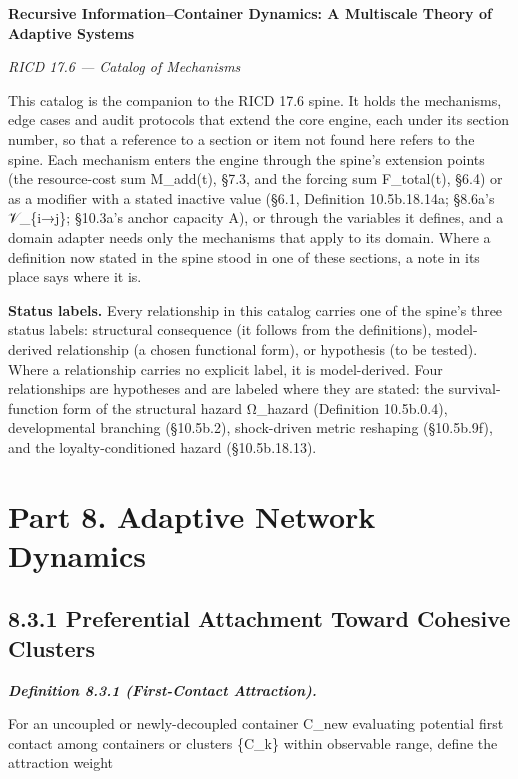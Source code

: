 \documentclass[
]{article}
\author{}
\date{}
\begin{document}
\textbf{Recursive Information--Container Dynamics: A Multiscale Theory
of Adaptive Systems}

\emph{RICD 17.6 --- Catalog of Mechanisms}

This catalog is the companion to the RICD 17.6 spine. It holds the
mechanisms, edge cases and audit protocols that extend the core engine,
each under its section number, so that a reference to a section or item
not found here refers to the spine. Each mechanism enters the engine
through the spine's extension points (the resource-cost sum M\_add(t),
§7.3, and the forcing sum F\_total(t), §6.4) or as a modifier with a
stated inactive value (§6.1, Definition 10.5b.18.14a; §8.6a's
𝒱\_\{i→j\}; §10.3a's anchor capacity A), or through the variables it
defines, and a domain adapter needs only the mechanisms that apply to
its domain. Where a definition now stated in the spine stood in one of
these sections, a note in its place says where it is.

\textbf{Status labels.} Every relationship in this catalog carries one
of the spine's three status labels: structural consequence (it follows
from the definitions), model-derived relationship (a chosen functional
form), or hypothesis (to be tested). Where a relationship carries no
explicit label, it is model-derived. Four relationships are hypotheses
and are labeled where they are stated: the survival-function form of the
structural hazard Ω\_hazard (Definition 10.5b.0.4), developmental
branching (§10.5b.2), shock-driven metric reshaping (§10.5b.9f), and the
loyalty-conditioned hazard (§10.5b.18.13).

\hypertarget{part-8.-adaptive-network-dynamics}{%
\section{Part 8. Adaptive Network
Dynamics}\label{part-8.-adaptive-network-dynamics}}

\hypertarget{preferential-attachment-toward-cohesive-clusters}{%
\subsection{8.3.1 Preferential Attachment Toward Cohesive
Clusters}\label{preferential-attachment-toward-cohesive-clusters}}

\emph{\textbf{Definition 8.3.1 (First-Contact Attraction).}}

For an uncoupled or newly-decoupled container C\_new evaluating
potential first contact among containers or clusters \{C\_k\} within
observable range, define the attraction weight
\end{document}
